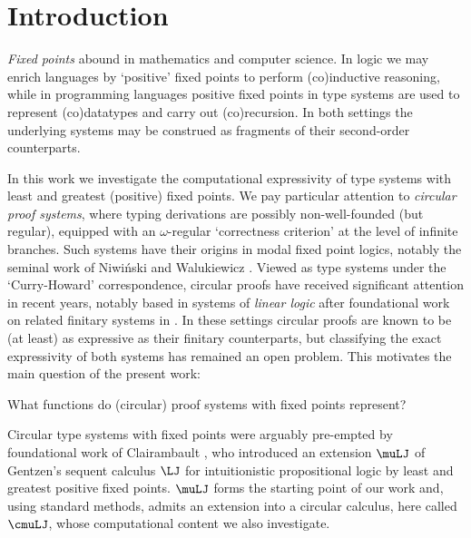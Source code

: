 

\section{Introduction}
\label{sec:intro}
\emph{Fixed points} abound in mathematics and computer science.
In logic we may enrich languages by `positive' fixed points to perform (co)inductive reasoning, while in
programming languages positive fixed points in type systems are used to represent (co)datatypes and carry out (co)recursion.
In both settings the underlying systems may be construed as fragments of their second-order counterparts.

In this work we investigate the computational expressivity of type systems with least and greatest (positive) fixed points.
We pay particular attention to \emph{circular proof systems}, where typing derivations are possibly non-well-founded (but regular), equipped with an $\omega$-regular `correctness criterion' at the level of infinite branches.
Such systems have their origins in modal fixed point logics, notably the seminal work of Niwi\'nski and Walukiewicz \cite{NiwWal96:games-for-mu-calc}.
Viewed as type systems under the `Curry-Howard' correspondence, circular proofs have received significant attention in recent years, notably based in systems of \emph{linear logic} \cite{BaeldeDS16Infinitaryprooftheory,EhrJaf21:cat-models-muLL,EhrJafSau21:totality-CmuMALL,BDKS22:bouncing-threads,DeSau19:infinets1,DePelSau:infinets2,DeJafSau22:phase-semantics} after foundational work on related finitary systems in \cite{BaeldeMiller07,Baelde12}.
In these settings circular proofs are known to be (at least) as expressive as their finitary counterparts, but classifying the exact expressivity of both systems has remained an open problem.
This motivates the main question of the present work:

\smallskip

\begin{question}
\label{question:main}
What functions do (circular) proof systems with fixed points represent?
\end{question}


\medskip


Circular type systems with fixed points were arguably pre-empted by foundational work of Clairambault \cite{Clairambault09}, who introduced an extension $\muLJ$ of Gentzen's sequent calculus $\LJ$ for intuitionistic propositional logic by least and greatest positive fixed points.
$\muLJ$ forms the starting point of our work and, using standard methods, admits an extension into a circular calculus, here called $\cmuLJ$, whose computational content we also investigate.

